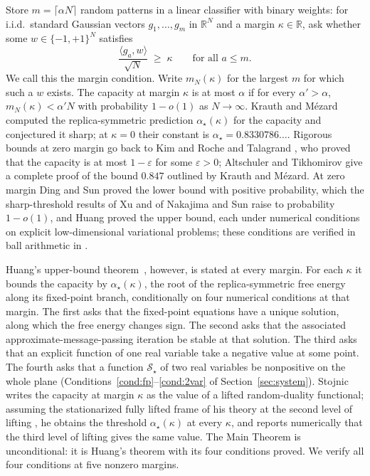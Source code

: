 \documentclass[11pt]{article}
\theoremstyle{remark}
\newcommand{\R}{\mathbb{R}}
\newcommand{\sS}{\mathcal{S}}
\begin{document}
Store $m=\lceil\alpha N\rceil$ random patterns in a linear classifier with binary
weights: for i.i.d.\ standard Gaussian vectors $g_1,\dots,g_m$ in
$\R^N$ and a margin $\kappa\in\R$, ask whether some
$w\in\{-1,+1\}^N$ satisfies
\[
\frac{\langle g_a, w\rangle}{\sqrt N}\;\ge\;\kappa
\qquad\text{for all } a\le m .
\]
We call this the margin condition.
Write $m_N(\kappa)$ for the largest $m$ for which such a $w$ exists.
The capacity at margin $\kappa$ is at most $\alpha$ if for every
$\alpha'>\alpha$, $m_N(\kappa)<\alpha' N$ with probability $1-o(1)$
as $N\to\infty$.
Krauth and M\'ezard \cite{krauth1989storage} computed the
replica-symmetric prediction $\alpha_\star(\kappa)$ for the capacity and
conjectured it sharp; at $\kappa=0$ their constant is
$\alpha_\star=0.8330786\dots$.  Rigorous bounds at zero margin
go back to Kim and Roche \cite{kimroche1998} and Talagrand
\cite{talagrand1999}, who proved that the capacity is at most
$1-\varepsilon$ for some $\varepsilon>0$; Altschuler and Tikhomirov
\cite{altschulertikhomirov2024} give a complete proof of the bound
$0.847$ outlined by Krauth and M\'ezard.  At zero margin Ding and
Sun \cite{ding2019capacity} proved the lower bound with positive
probability, which the sharp-threshold results of Xu \cite{xu2021} and
of Nakajima and Sun \cite{nakajimasun2022} raise to probability
$1-o(1)$, and Huang \cite{huang2024capacity} proved the upper bound,
each under numerical conditions on explicit low-dimensional
variational problems; these conditions are verified in ball
arithmetic in \cite{shmalo2026capacity}.

Huang's upper-bound theorem~\cite[Theorem~3.6]{huang2024capacity},
however, is stated at every margin.  For
each $\kappa$ it bounds the capacity by $\alpha_\star(\kappa)$, the
root of the replica-symmetric free energy along its fixed-point
branch, conditionally on four numerical conditions at that margin.
The first asks that the fixed-point equations have a unique solution,
along which the free energy changes sign.  The second asks that the
associated approximate-message-passing iteration be stable at that
solution.  The third asks that an explicit function of one real
variable take a negative value at some point.  The fourth
asks that a function $\sS_\star$ of two real variables be
nonpositive on the whole plane (Conditions~\ref{cond:fp}--\ref{cond:2var} of
Section~\ref{sec:system}).  Stojnic~\cite{stojnic2023} writes the capacity at margin $\kappa$
as the value of a lifted random-duality functional; assuming the
stationarized fully lifted frame of his theory at the second level
of lifting \cite[Theorem~3]{stojnic2023}, he obtains the threshold
$\alpha_\star(\kappa)$ at every $\kappa$, and reports numerically that
the third level of lifting gives the same value.  The Main Theorem is
unconditional: it is Huang's theorem with its four conditions
proved.  We verify all four conditions
at five nonzero margins.
\end{document}
